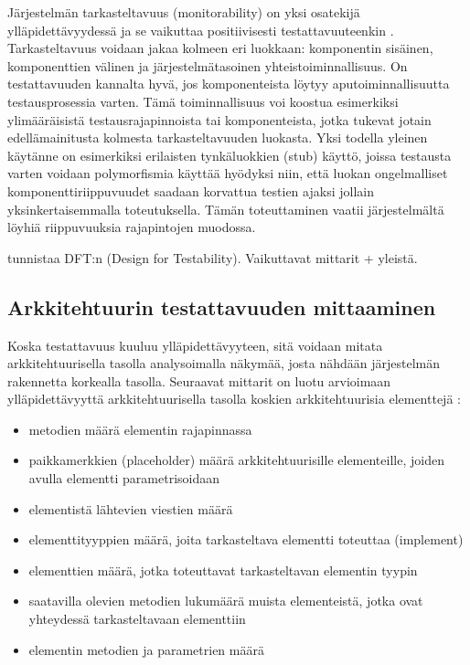 \documentclass[finnish]{tktltiki2}
\theoremstyle{definition}
\theoremstyle{remark}
\begin{document}

Järjestelmän tarkasteltavuus (monitorability) on yksi osatekijä ylläpidettävyydessä ja se vaikuttaa positiivisesti testattavuuteenkin \citep[s. 4]{mari_impact_2003}. Tarkasteltavuus voidaan jakaa kolmeen eri luokkaan: komponentin sisäinen, komponenttien välinen ja järjestelmätasoinen yhteistoiminnallisuus. On testattavuuden kannalta hyvä, jos komponenteista löytyy aputoiminnallisuutta testausprosessia varten. Tämä toiminnallisuus voi koostua esimerkiksi ylimääräisistä testausrajapinnoista tai komponenteista, jotka tukevat jotain edellämainitusta kolmesta tarkasteltavuuden luokasta. Yksi todella yleinen käytänne on esimerkiksi erilaisten tynkäluokkien (stub) käyttö, joissa testausta varten voidaan polymorfismia käyttää hyödyksi niin, että luokan ongelmalliset komponenttiriippuvuudet saadaan korvattua testien ajaksi jollain yksinkertaisemmalla toteutuksella. Tämän toteuttaminen vaatii järjestelmältä löyhiä riippuvuuksia rajapintojen muodossa.

\citep[s. 591-592]{joshi_design_2014} tunnistaa DFT:n (Design for Testability). Vaikuttavat mittarit + yleistä. 




\subsection{Arkkitehtuurin testattavuuden mittaaminen}

Koska testattavuus kuuluu ylläpidettävyyteen, sitä voidaan mitata arkkitehtuurisella tasolla analysoimalla näkymää, josta nähdään järjestelmän rakennetta korkealla tasolla. Seuraavat mittarit on luotu arvioimaan ylläpidettävyyttä arkkitehtuurisella tasolla koskien arkkitehtuurisia elementtejä \citep[s. 3-4]{bengtsson1998towards}:

\begin{itemize}
	\item metodien määrä elementin rajapinnassa
	\item paikkamerkkien (placeholder) määrä arkkitehtuurisille elementeille, joiden avulla elementti parametrisoidaan
	\item elementistä lähtevien viestien määrä
	\item elementtityyppien määrä, joita tarkasteltava elementti toteuttaa (implement)
	\item elementtien määrä, jotka toteuttavat tarkasteltavan elementin tyypin
	\item saatavilla olevien metodien lukumäärä muista elementeistä, jotka ovat yhteydessä tarkasteltavaan elementtiin
	\item elementin metodien ja parametrien määrä
\end{itemize}
\end{document}

